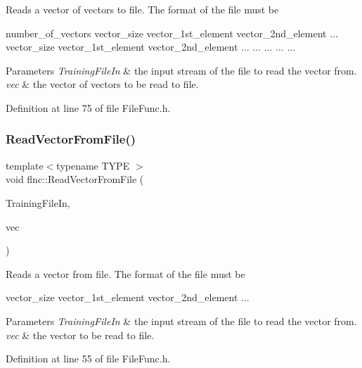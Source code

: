 Reads a vector of vectors to file. The format of the file must be 
\begin{DoxyCode}
number\_of\_vectors
vector\_size vector\_1st\_element vector\_2nd\_element ...
vector\_size vector\_1st\_element vector\_2nd\_element ...
    ...            ...                ...         ...
\end{DoxyCode}



\begin{DoxyParams}{Parameters}
{\em Training\+File\+In} & the input stream of the file to read the vector from. \\
\hline
{\em vec} & the vector of vectors to be read to file. \\
\hline
\end{DoxyParams}


Definition at line 75 of file File\+Func.\+h.

\mbox{\label{namespaceflnc_a51e2434fe14f26a9d979282b2d6524f5}} 
\subsubsection{Read\+Vector\+From\+File()}
{\footnotesize\ttfamily template$<$typename T\+Y\+PE $>$ \\
void flnc\+::\+Read\+Vector\+From\+File (\begin{DoxyParamCaption}\item[{\textbf{ minput\+\_\+stream} $\ast$}]{Training\+File\+In,  }\item[{std\+::vector$<$ T\+Y\+PE $>$ \&}]{vec }\end{DoxyParamCaption})}

Reads a vector from file. The format of the file must be 
\begin{DoxyCode}
vector\_size vector\_1st\_element vector\_2nd\_element ...
\end{DoxyCode}



\begin{DoxyParams}{Parameters}
{\em Training\+File\+In} & the input stream of the file to read the vector from. \\
\hline
{\em vec} & the vector to be read to file. \\
\hline
\end{DoxyParams}


Definition at line 55 of file File\+Func.\+h.

